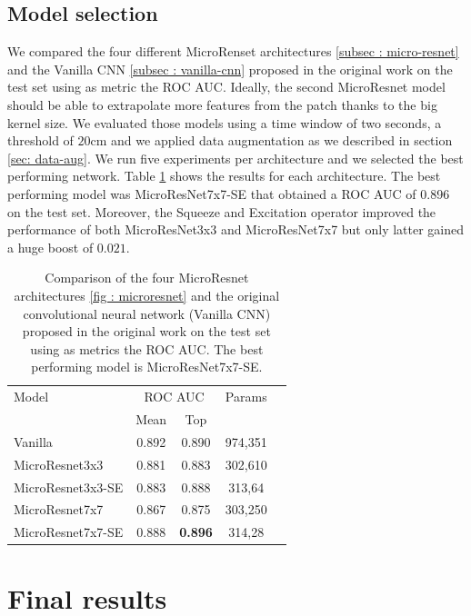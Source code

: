 \documentclass[../document.tex]{subfiles}
\begin{document}
\subsection{Model selection}
We compared the four different MicroRenset architectures \ref{subsec : micro-resnet} and the Vanilla CNN \ref{subsec : vanilla-cnn} proposed in the original work \cite{omar2018traversability} on the test set using as metric the ROC AUC.  Ideally, the second MicroResnet model should be able to extrapolate more features from the patch thanks to the big kernel size. We evaluated those models using a time window of two seconds, a threshold of $20$cm and we applied data augmentation as we described in section \ref{sec: data-aug}. We run five experiments per architecture and we selected the best performing network. Table \ref{tab : models-results-comparison} shows the results for each architecture. The best performing model was MicroResNet7x7-SE that obtained a ROC AUC of 0.896 on the test set. Moreover, the Squeeze and Excitation operator improved the performance of both MicroResNet3x3 and MicroResNet7x7 but only latter gained a huge boost of $0.021$.
\begin{table}[ht]
  \centering
  \begin{tabular}{@{}lcccc@{}}
    \toprule
    Model & \multicolumn{2}{c}{ROC AUC} & Params \\ 
    \cline{1-4}
    & Mean & Top &  \\ 
    \cline{1-4}
    Vanilla  & 0.892& 0.890 &  974,351 \\
    MicroResnet3x3 & 0.881 & 0.883 & 302,610 \\
    MicroResnet3x3-SE & 0.883 & 0.888 & 313,64\\
    MicroResnet7x7 & 0.867 & 0.875 &  303,250\\
    MicroResnet7x7-SE &0.888 & \textbf{0.896} & 314,28\\
    \bottomrule   
  \end{tabular}
  \caption{Comparison of the four MicroResnet architectures \ref{fig : microresnet} and the original convolutional neural network (Vanilla CNN) proposed in the original work \cite{omar2018traversability} on the test set using as metrics the ROC AUC. The best performing model is MicroResNet7x7-SE.}
  \label{tab : models-results-comparison}
\end{table}
\section{Final results}
\end{document}
